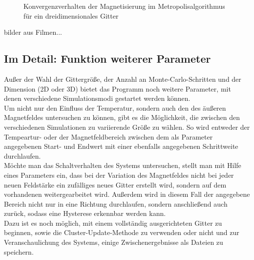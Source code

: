 \begin{figure}[H]
	\centering
	\caption{Konvergenzverhalten der Magnetisierung im Metropolisalgorithmus für ein dreidimensionales Gitter}
	\label{mp3dkonv}
\end{figure}

bilder aus Filmen...

\subsection{Im Detail: Funktion weiterer Parameter}

Außer der Wahl der Gittergröße, der Anzahl an Monte-Carlo-Schritten und der Dimension (2D oder 3D) bietet das Programm noch weitere Parameter, mit denen verschiedene Simulationsmodi gestartet werden können.\\
Um nicht nur den Einfluss der Temperatur, sondern auch den des äußeren Magnetfeldes untersuchen zu können, gibt es die Möglichkeit, die zwischen den verschiedenen Simulationen zu variierende Größe zu wählen. So wird entweder der Tempeartur- oder der Magnetfeldbereich zwischen dem als Parameter angegebenen Start- und Endwert mit einer ebenfalls angegebenen Schrittweite durchlaufen.\\
Möchte man das Schaltverhalten des Systems untersuchen, stellt man mit Hilfe eines Parameters ein, dass bei der Variation des Magnetfeldes nicht bei jeder neuen Feldstärke ein zufälliges neues Gitter erstellt wird, sondern auf dem vorhandenen weitergearbeitet wird. Außerdem wird in diesem Fall der angegebene Bereich nicht nur in eine Richtung durchlaufen, sondern anschließend auch zurück, sodass eine Hysterese erkennbar werden kann.\\
Dazu ist es noch möglich, mit einem vollständig ausgerichteten Gitter zu beginnen, sowie die Cluster-Update-Methode zu verwenden oder nicht und zur Veranschaulichung des Systems, einige Zwischenergebnisse als Dateien zu speichern.
